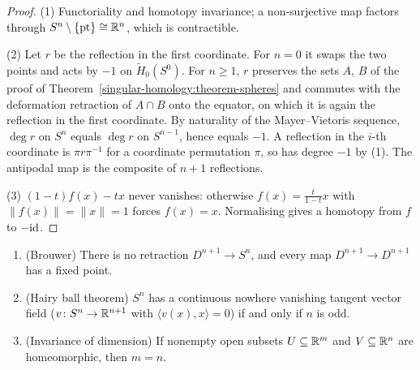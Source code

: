 \begin{proof}
(1) Functoriality and homotopy invariance; a non-surjective map factors through $S^n \setminus \{\mathrm{pt}\} \cong \mathbb{R}^n$, which is contractible.

(2) Let $r$ be the reflection in the first coordinate. For $n = 0$ it swaps the two points and acts by $-1$ on $\tilde{H}_0(S^0)$. For $n \geq 1$, $r$ preserves the sets $A$, $B$ of
the proof of Theorem~\ref{singular-homology:theorem-spheres} and commutes with the deformation retraction of $A \cap B$ onto the equator, on which it is again the
reflection in the first coordinate. By naturality of the Mayer--Vietoris sequence, $\deg r$ on $S^n$ equals $\deg r$ on $S^{n-1}$, hence equals $-1$. A reflection in the
$i$-th coordinate is $\pi r \pi^{-1}$ for a coordinate permutation $\pi$, so has degree $-1$ by (1). The antipodal map is the composite of $n + 1$ reflections.

(3) $(1 - t)f(x) - tx$ never vanishes: otherwise $f(x) = \frac{t}{1-t}x$ with $\|f(x)\| = \|x\| = 1$ forces $f(x) = x$. Normalising gives a homotopy from $f$ to $-\mathrm{id}$.
\end{proof}

\begin{corollary}\label{singular-homology:corollary-sphere-applications}
\begin{enumerate}
\item (Brouwer) There is no retraction $D^{n+1} \to S^n$, and every map $D^{n+1} \to D^{n+1}$ has a fixed point.
\item (Hairy ball theorem) $S^n$ has a continuous nowhere vanishing tangent vector field ($v \colon S^n \to \mathbb{R}^{n+1}$ with $\langle v(x), x \rangle = 0$) if and only if
$n$ is odd.
\item (Invariance of dimension) If nonempty open subsets $U \subseteq \mathbb{R}^m$ and $V \subseteq \mathbb{R}^n$ are homeomorphic, then $m = n$.
\end{enumerate}
\end{corollary}

